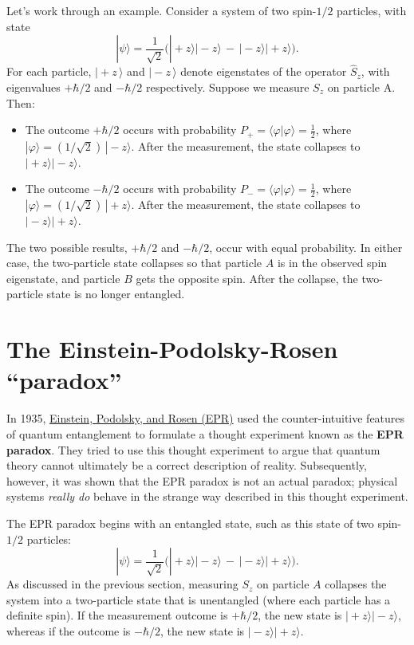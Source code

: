\documentclass[pra,12pt]{revtex4}
\begin{document}
Let's work through an example.  Consider a system of two spin-$1/2$
particles, with state
$$|\psi\rangle = \frac{1}{\sqrt{2}} \Big(|\!+\!z\rangle|\!-\!z\rangle \,-\, |\!-\!z\rangle|\!+\!z\rangle\Big).$$
For each particle, $|\!+\!z\,\rangle$ and $|\!-\!z\,\rangle$ denote
eigenstates of the operator $\hat{S}_z$, with eigenvalues $+\hbar/2$
and $-\hbar/2$ respectively.  Suppose we measure $S_z$ on particle A.
Then:
\begin{itemize}
\item The outcome $+\hbar/2$ occurs with probability $P_+ = \langle
  \varphi|\varphi\rangle = \frac{1}{2}$, where $|\varphi\rangle =
  (1/\sqrt{2})\,|\!-\!z\rangle$.  After the measurement, the state
  collapses to $|\!+\!z\rangle |\!-\!z\rangle$.

\item The outcome $-\hbar/2$ occurs with probability $P_- = \langle
  \varphi|\varphi\rangle = \frac{1}{2}$, where $|\varphi\rangle =
  (1/\sqrt{2})\,|\!+\!z\rangle$.  After the measurement, the state
  collapses to $|\!-\!z\rangle |\!+\!z\rangle$.
\end{itemize}
The two possible results, $+\hbar/2$ and $-\hbar/2$, occur with equal
probability.  In either case, the two-particle state collapses so that
particle $A$ is in the observed spin eigenstate, and particle $B$
gets the opposite spin.  After the collapse, the two-particle state is
no longer entangled.

\section{The Einstein-Podolsky-Rosen ``paradox''}

In 1935, \hyperref[cite:epr]{Einstein, Podolsky, and Rosen (EPR)} used
the counter-intuitive features of quantum entanglement to formulate a
thought experiment known as the \textbf{EPR paradox}.  They tried to
use this thought experiment to argue that quantum theory cannot
ultimately be a correct description of reality.  Subsequently,
however, it was shown that the EPR paradox is not an actual paradox;
physical systems \textit{really do} behave in the strange way
described in this thought experiment.

The EPR paradox begins with an entangled state, such as
this state of two spin-$1/2$ particles:
$$|\psi\rangle = \frac{1}{\sqrt{2}} \Big(|\!+\!z\rangle|\!-\!z\rangle \,-\, |\!-\!z\rangle|\!+\!z\rangle\Big).$$
As discussed in the previous section, measuring $S_z$ on particle $A$
collapses the system into a two-particle state that is unentangled
(where each particle has a definite spin).  If the measurement outcome
is $+\hbar/2$, the new state is $|\!+\!z\rangle |\!-\!z\rangle$,
whereas if the outcome is $-\hbar/2$, the new state is
$|\!-\!z\rangle|\!+\!z\rangle$.
\end{document}
